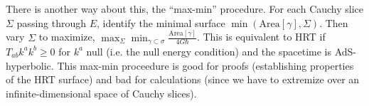 There is another way about this, the ``max-min'' procedure. For each Cauchy slice $\Sigma$ passing through $E$, identify the minimal surface $\min(\text{Area}[\gamma],\Sigma)$. Then vary $\Sigma$ to maximize, $\max_\Sigma \min_{\gamma\subset \sigma} \frac{\text{Area}[\gamma]}{4G\hbar}$. This is equivalent to HRT if $T_{ab} k^a k^b \geq 0$ for $k^a$ null (i.e. the null energy condition) and the spacetime is AdS-hyperbolic. This max-min proceedure is good for proofs (establishing properties of the HRT surface) and bad for calculations (since we have to extremize over an infinite-dimensional space of Cauchy slices).